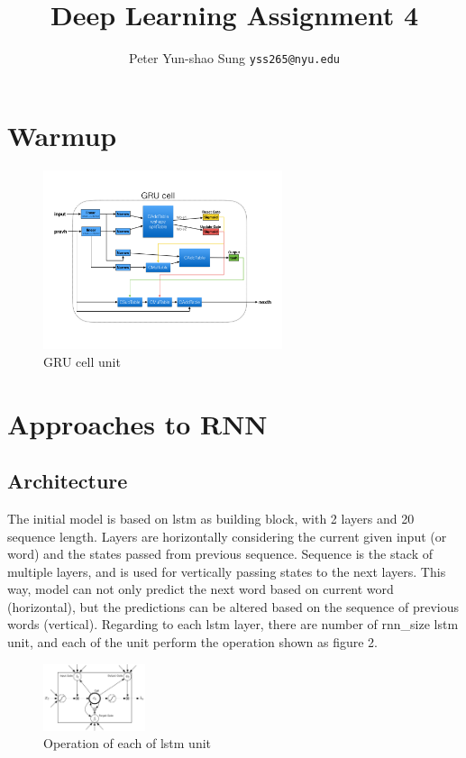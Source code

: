 \documentclass{article}
\title{Deep Learning Assignment 4}
\author{
  Peter Yun-shao Sung
  \texttt{yss265@nyu.edu} \\
}
\begin{document}

\maketitle
\section{Warmup}
\begin{figure}[h]
\centering
\includegraphics[width=70mm]{../q2/q2.png}
  \caption{GRU cell unit}
\end{figure}

\section{Approaches to RNN}
\subsection{Architecture}
The initial model is based on lstm as building block, with 2 layers and 20 sequence length. Layers are horizontally considering the current given input (or word) and the states passed from previous sequence. Sequence is the stack of multiple layers, and is used for vertically passing states to the next layers. This way, model can not only predict the next word based on current word (horizontal), but the predictions can be altered based on the sequence of previous words (vertical). Regarding to each lstm layer, there are number of rnn\_size lstm unit, and each of the unit perform the operation shown as figure 2.

\begin{figure}[h]
\centering
\includegraphics[width=30mm]{./fig/lstm.png}
  \caption{Operation of each of lstm unit}
\end{figure}
\end{document}
